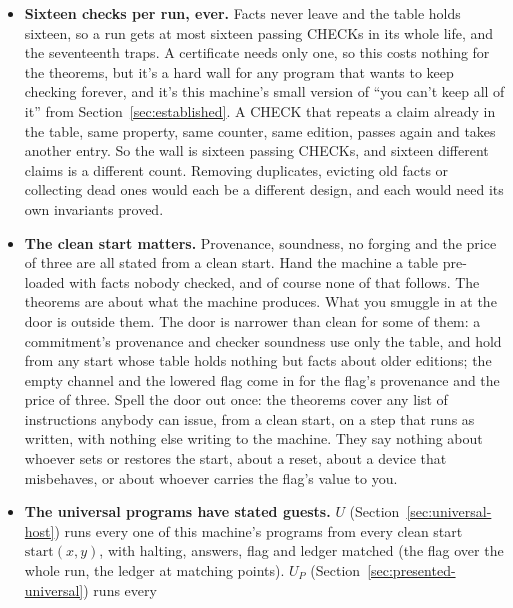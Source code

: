 \documentclass[11pt,twoside]{article}
\theoremstyle{thielethm}
\theoremstyle{thieledef}
\theoremstyle{thieledef}
\theoremstyle{thieledef}
\theoremstyle{thielethm}
\theoremstyle{thieleobs}
\theoremstyle{thielethm}
\begin{document}
\begin{itemize}
certifications that each last would need a record richer than one flag. The publication file constructed earlier in this chapter keeps the set of
claims certified at least once. That extension shows exactly what the native
state left out. It still does not record which certification came first or
at what step; those questions would need their own retained answers.
\item \textbf{Sixteen checks per run, ever.} Facts never leave and the table holds sixteen, so a run
gets at most sixteen passing CHECKs in its whole life, and the seventeenth traps. A
certificate needs only one, so this costs nothing for the theorems, but it's a hard wall
for any program that wants to keep checking forever, and it's this machine's small version of
``you can't keep all of it'' from Section~\ref{sec:established}. A CHECK that repeats a claim already in the
table, same property, same counter, same edition, passes again and takes another entry. So the
wall is sixteen passing CHECKs, and sixteen different claims is a different count. Removing
duplicates, evicting old facts or collecting dead ones would each be a different design, and each
would need its own invariants proved.
\item \textbf{The clean start matters.} Provenance, soundness, no forging and the price of three are
all stated from a clean start. Hand the machine a table pre-loaded with facts nobody
checked, and of course none of that follows. The theorems are about what the machine
produces. What you smuggle in at the door is outside them. The door is narrower than clean for some of them: a commitment's provenance and checker soundness use only the table, and hold from any start whose table holds nothing but facts about older editions; the empty channel and the lowered flag come in for the flag's provenance and the price of three. Spell the door out once: the theorems
cover any list of instructions anybody can issue, from a clean start, on a step that runs as
written, with nothing else writing to the machine. They say nothing about whoever sets or
restores the start, about a reset, about a device that misbehaves, or about whoever carries the
flag's value to you.
\item \textbf{The universal programs have stated guests.} $U$ (Section~\ref{sec:universal-host}) runs every one of this machine's
programs from every clean start $\mathrm{start}(x, y)$, with halting, answers, flag and ledger matched (the flag over the whole run, the ledger at matching points). $U_P$ (Section~\ref{sec:presented-universal}) runs every

\end{itemize}
\end{document}
